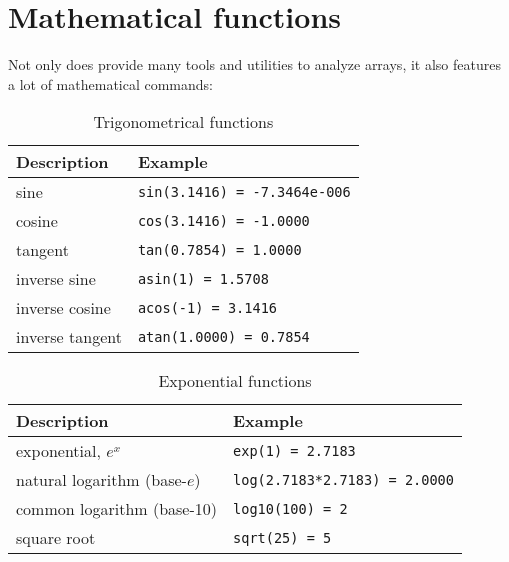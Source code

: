 \chapter{Mathematical functions}
\thispagestyle{fancy}
\label{ch:math-functions}

\noindent Not only does \MATLAB{} provide many tools and utilities to analyze arrays, it also features a lot of mathematical commands:

\begin{table}[!ht]
\caption{Trigonometrical functions}
\label{tab:math-functions-trigonometry}
\vspace{-0.25em}
\centering
\begin{tabularx}{0.8\textwidth}{ |X|X| } \hline
\textbf{Description}&\textbf{Example}\\ \hline
sine&{\tt sin(3.1416) = -7.3464e-006}\index{sin@\texttt{sin}}\\ \hline
cosine&{\tt cos(3.1416) = -1.0000}\index{cos@\texttt{cos}}\\ \hline
tangent&{\tt tan(0.7854) = 1.0000}\index{tan@\texttt{tan}}\\ \hline
inverse sine&{\tt asin(1) = 1.5708}\index{asin@\texttt{asin}}\\ \hline
inverse cosine&{\tt acos(-1) = 3.1416}\index{acos@\texttt{acos}}\\ \hline
inverse tangent&{\tt atan(1.0000) = 0.7854}\index{atan@\texttt{atan}}\\ \hline
\end{tabularx}
\end{table}




\begin{table}[ht]
\caption{Exponential functions}
\label{tab:math-functions-exp}
\vspace{-0.25em}
\centering
\begin{tabularx}{0.8\textwidth}{ |X|X| } \hline
\textbf{Description}&\textbf{Example}\\ \hline
exponential, $e^x$&{\tt exp(1) = 2.7183}\index{exp (base-e exponentiation)@\texttt{exp} (base-$e$ exponentiation)}\index{e!base-e exponentiation@base-$e$ exponentiation}\index{base-e exponentiation@base-$e$ exponentiation}\\ \hline
natural logarithm (base-$e$)&{\tt log(2.7183*2.7183) = 2.0000}\index{log@\texttt{log}}\\ \hline
common logarithm (base-10)&{\tt log10(100) = 2}\index{log10@\texttt{log10}}\\ \hline
square root&{\tt sqrt(25) = 5}\index{sqrt@\texttt{sqrt}}\\ \hline
\end{tabularx}
\end{table}



